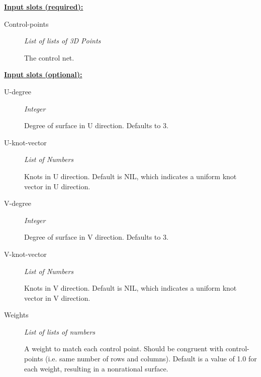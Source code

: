 \documentclass [11pt]{book}
\begin{document}
\begin{itemize}
\textbf{
\underline{Input slots (required):}}

\begin{description}

\item [Control-points]
\emph{List of lists of 3D Points}

 The control net.




\end{description}






\textbf{
\underline{Input slots (optional):}}

\begin{description}

\item [U-degree]
\emph{Integer}

 Degree of surface in U direction. Defaults to 3.




\item [U-knot-vector]
\emph{List of Numbers}

 Knots in U direction. Default is NIL, which indicates a uniform knot vector in U direction.




\item [V-degree]
\emph{Integer}

 Degree of surface in V direction. Defaults to 3.




\item [V-knot-vector]
\emph{List of Numbers}

 Knots in V direction. Default is NIL, which indicates a uniform knot vector in V direction.




\item [Weights]
\emph{List of lists of numbers}

 A weight to match each control point. Should be congruent with control-points
(i.e. same number of rows and columns). Default is a value of 1.0 for each weight, resulting in a nonrational surface.




\end{description}








\end{itemize}
\end{document}
